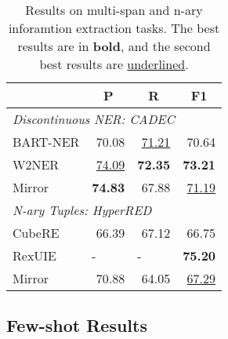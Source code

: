 \begin{table}[]
  \centering
  \begin{tabular}{lrrr}
    \toprule
    & \multicolumn{1}{c}{P} & \multicolumn{1}{c}{R} & \multicolumn{1}{c}{F1} \\
    \midrule
    \multicolumn{4}{l}{\textit{Discontinuous NER: CADEC}}                           \\
    BART-NER & 70.08                 & \underline{ 71.21}           & 70.64                  \\
    W2NER    & \underline{ 74.09}           & \textbf{72.35}        & \textbf{73.21}         \\
    Mirror   & \textbf{74.83}        & 67.88                 & \underline{ 71.19}            \\
    \midrule
    \multicolumn{4}{l}{\textit{N-ary Tuples: HyperRED}}                             \\
    CubeRE   & 66.39                 & 67.12                 & 66.75                  \\
    RexUIE   & \multicolumn{1}{l}{-} & \multicolumn{1}{l}{-} & \textbf{75.20}         \\
    Mirror   & 70.88                 & 64.05                 & \underline{ 67.29} \\
    \bottomrule
  \end{tabular}%
  \caption{
    Results on multi-span and n-ary inforamtion extraction tasks.
    The best results are in \textbf{bold}, and the second best results are \underline{underlined}.
  }
  \label{tab:multi-span-n-ary-results}
\end{table}

\subsection{Few-shot Results}

